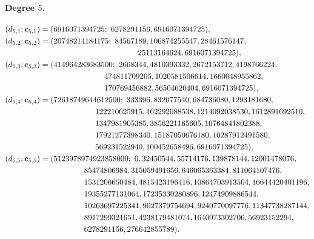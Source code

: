 \documentclass[11pt]{article}
\begin{document}
\paragraph{Degree $5$.}
\begin{align*}
(d_{5,1};\mathbf c_{5,1})={}&(6916071394725;\ 6278291156,6916071394725),\\
(d_{5,2};\mathbf c_{5,2})={}&(20748214184175;\ 84567189,106874255547,28461576147,\\
&\hspace{39mm}25113164624,6916071394725),\\
(d_{5,3};\mathbf c_{5,3})={}&(414964283683500;\ 2668344,4810393332,2672153712,4198766224,\\
&\hspace{24mm}474811709205,1020581506614,1660048955862,\\
&\hspace{24mm}170769456882,56504620404,6916071394725),\\
(d_{5,4};\mathbf c_{5,4})={}&(72618749644612500;\ 333396,832077540,684736080,1293181680,\\
&\hspace{20mm}122210625915,462292088538,1214092038530,1612891692510,\\
&\hspace{20mm}1347981905385,3856221165605,10764841802388,\\
&\hspace{20mm}17921277398340,15187050676180,10287912491580,\\
&\hspace{20mm}569231522940,100452658496,6916071394725),\\
(d_{5,5};\mathbf c_{5,5})={}&(5123978974923858000;\ 0,32450544,55714176,139878144,12001478076,\\
&\hspace{15mm}85474806984,315059491656,646065363384,811064107476,\\
&\hspace{15mm}1531206650484,4815423196416,10864703913504,16644420401196,\\
&\hspace{15mm}19355277131064,17235330280896,12474909886544,\\
&\hspace{15mm}10263697225341,9027379754694,9240770097776,11347738287144,\\
&\hspace{15mm}8917299321651,4238179481074,1640073302706,56923152294,\\
&\hspace{15mm}6278291156,276642855789).
\end{align*}
\endgroup



\end{document}
